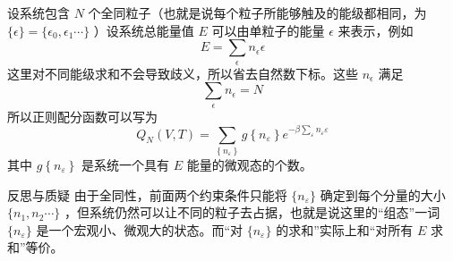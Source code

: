 设系统包含 $N$ 个全同粒子（也就是说每个粒子所能够触及的能级都相同，为 $\{\epsilon\} = \{\epsilon_0,\epsilon_1\cdots\}$ ）设系统总能量值 $E$ 可以由单粒子的能量 $\epsilon$ 来表示，例如
\[
    E = \sum_\epsilon n_\epsilon \epsilon
\]
这里对不同能级求和不会导致歧义，所以省去自然数下标。这些 $n_\epsilon$ 满足
\[
    \sum_\epsilon n_\epsilon = N
\]
所以正则配分函数可以写为
\begin{equation}\label{equ:canonical_quantum}
    Q_N(V, T)=\sum_{\left\{n_{\varepsilon}\right\}} g\left\{n_{\varepsilon}\right\} e^{-\beta \sum_{\varepsilon} n_{\varepsilon} \varepsilon}
\end{equation}
其中 $g\left\{n_{\varepsilon}\right\}$ 是系统一个具有 $E$ 能量的微观态的个数。

\begin{justification}{\kaishu 反思与质疑}
    \kaishu \fontsize{11pt}{16pt}
        由于全同性，前面两个约束条件只能将 $\{n_{\varepsilon}\}$ 确定到每个分量的大小 $\{n_1,n_2\cdots\}$ ，但系统仍然可以让不同的粒子去占据，也就是说这里的“组态”一词 $\{n_{\varepsilon}\}$ 是一个宏观小、微观大的状态。而“对 $\{n_{\varepsilon}\}$ 的求和”实际上和“对所有 $E$ 求和”等价。
\end{justification}

